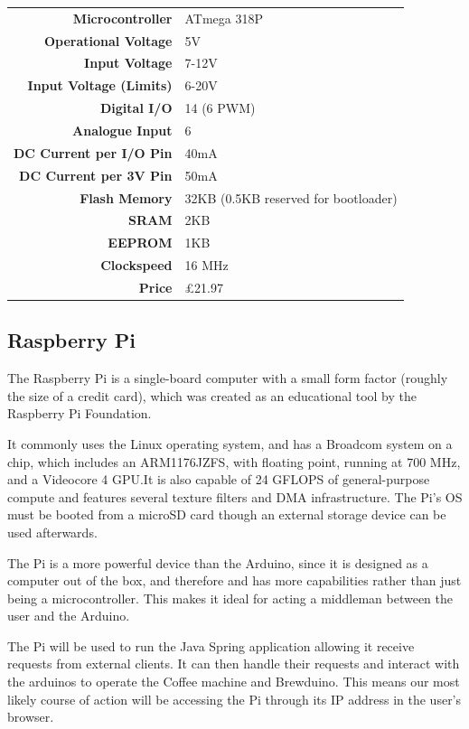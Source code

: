 \documentclass[12pt, a4paper]{article}
\begin{document}
\begin{tabular}{>{\bfseries}r l}
	Microcontroller & ATmega 318P \\
	Operational Voltage & 5V \\
	Input Voltage & 7-12V \\
	Input Voltage (Limits) & 6-20V \\
	Digital I/O & 14 (6 PWM) \\
	Analogue Input & 6 \\
	DC Current per I/O Pin & 40mA \\
	DC Current per 3V Pin & 50mA \\
	Flash Memory & 32KB (0.5KB reserved for bootloader) \\
	SRAM & 2KB \\
	EEPROM & 1KB \\
	Clockspeed & 16 MHz \\
	Price & £21.97 \\
\end{tabular}

\newpage


\subsection{Raspberry Pi}
The Raspberry Pi is a single-board computer with a small form factor (roughly
the size of a credit card), which was created as an educational tool by the
Raspberry Pi Foundation. 

It commonly uses the Linux operating system, and has a Broadcom system on a
chip, which includes an ARM1176JZFS, with floating point, running at 700 MHz,
and a Videocore 4 GPU.It is also capable of 24 GFLOPS of general-purpose
compute and features several texture filters and DMA infrastructure. The Pi’s OS
must be booted from a microSD card though an external storage device can be used
afterwards.

The Pi is a more powerful device than the Arduino, since it is designed as a
computer out of the box, and therefore and has more capabilities rather than
just being a microcontroller. This makes it ideal for acting a middleman between
the user and the Arduino.

The Pi will be used to run the Java Spring application allowing it receive 
requests from external clients. It can then handle their requests and interact 
with the arduinos to operate the Coffee machine and Brewduino. This means our
most likely course of action will be accessing the Pi through its IP address in
the user's browser.
\end{document}
